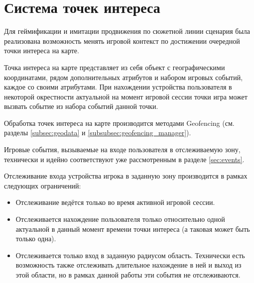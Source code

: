\section{Система точек интереса}
\label{sec:geofencing}
Для геймификации и имитации продвижения по сюжетной линии сценария была реализована возможность менять игровой контекст по достижении очередной точки интереса на карте.

Точка интереса на карте представляет из себя объект с географическими координатами, рядом дополнительных атрибутов и набором игровых событий, каждое со своими атрибутами. При нахождении устройства пользователя в некоторой окрестности актуальной на момент игровой сессии точки игра может вызвать событие из набора событий данной точки.

Обработка точек интереса на карте производится методами Geofencing (см. разделы \ref{subsec:geodata} и \ref{subsubsec:geofencing_manager}).

Игровые события, вызываемые на входе пользователя в отслеживаемую зону, технически и идейно соответствуют уже рассмотренным в разделе \ref{sec:events}.

Отслеживание входа устройства игрока в заданную зону производится в рамках следующих ограничений:
\begin{itemize}
	\item Отслеживание ведётся только во время активной игровой сессии.
	\item Отслеживается нахождение пользователя только относительно одной актуальной в данный момент времени точки интереса (а таковая может быть только одна).
	\item Отслеживается только вход в заданную радиусом область. Технически есть возможность также отслеживать длительное нахождение в ней и выход из этой области, но в рамках данной работы эти события не отслеживаются.
\end{itemize}